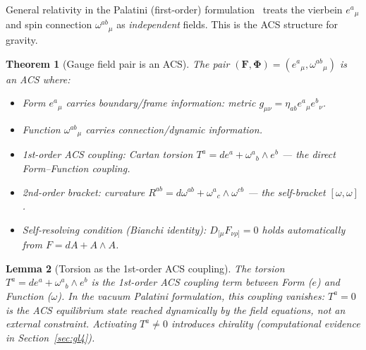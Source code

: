 \documentclass[11pt,a4paper]{article}
\theoremstyle{plain}
\newtheorem{theorem}{Theorem}[section]
\newtheorem{lemma}[theorem]{Lemma}
\theoremstyle{definition}
\theoremstyle{remark}
\newcommand{\FormF}{\mathbf{F}}
\newcommand{\FuncF}{\boldsymbol{\Phi}}
\begin{document}
General relativity in the Palatini (first-order) formulation~\cite{Palatini1919} treats the 
vierbein $e^a{}_\mu$ and spin connection $\omega^{ab}{}_\mu$ as \emph{independent} 
fields.  This is the ACS structure for gravity.

\begin{theorem}[Gauge field pair is an ACS]\label{thm:gravity-acs}
The pair $(\FormF, \FuncF) = (e^a{}_\mu, \omega^{ab}{}_\mu)$ is an ACS where:
\begin{itemize}[noitemsep]
  \item Form $e^a{}_\mu$ carries boundary/frame information: metric $g_{\mu\nu} = \eta_{ab}e^a{}_\mu e^b{}_\nu$.
  \item Function $\omega^{ab}{}_\mu$ carries connection/dynamic information.
  \item 1st-order ACS coupling: Cartan torsion 
    $T^a = de^a + \omega^a{}_b \wedge e^b$ --- the direct Form--Function coupling.
  \item 2nd-order bracket: curvature 
    $R^{ab} = d\omega^{ab} + \omega^a{}_c \wedge \omega^{cb}$ --- the self-bracket $[\omega,\omega]$.
  \item Self-resolving condition (Bianchi identity): 
    $D_{[\mu}F_{\nu\rho]} = 0$ holds automatically from $F = dA + A\wedge A$.
\end{itemize}
\end{theorem}

\begin{lemma}[Torsion as the 1st-order ACS coupling]\label{lem:torsion}\label{thm:C2-closed}
The torsion $T^a = de^a + \omega^a{}_b \wedge e^b$ is the \emph{1st-order
ACS coupling term} between Form ($e$) and Function ($\omega$).  In the
vacuum Palatini formulation, this coupling vanishes: $T^a = 0$ is the
\emph{ACS equilibrium state} reached dynamically by the field equations,
not an external constraint.  Activating $T^a\neq 0$ introduces chirality
(computational evidence in Section~\ref{sec:gl4}).
\end{lemma}
\end{document}
